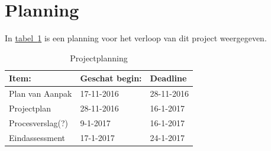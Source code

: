 \documentclass[numbers=endperiod]{scrartcl}
\newcommand{\sectionSmall}[1]{
	\vspace{-10pt}
	\section{#1}
	\vspace{-5pt}
}
\newcommand{\tableref}[1]{\hyperref[table:#1]{tabel~\ref{table:#1}}}
\begin{document}
	\sectionSmall{Planning}
	In \tableref{Planning} is een planning voor het verloop van dit project weergegeven.
	\begin{table}[h]
		\caption{Projectplanning}\label{table:Planning}
		\centering
		\begin{tabular}{| p{} | p{} | p{} |}
			\hline \rowcolor{hhs_theme_heading_2}
			Item: 				& Geschat begin:& Deadline \\ \hline
			Plan van Aanpak 	& 17-11-2016 	& 28-11-2016 \\ \hline
			Projectplan		 	& 28-11-2016	& 16-1-2017 \\ \hline
			Procesverslag(?)	& 9-1-2017		& 16-1-2017 \\ \hline
			Eindassessment		& 17-1-2017		& 24-1-2017 \\ \hline
		\end{tabular}
	\end{table}
	\cite{Doe:2009:Online}
	
	\newpage
	
	\printbibliography
	
	
\end{document}
